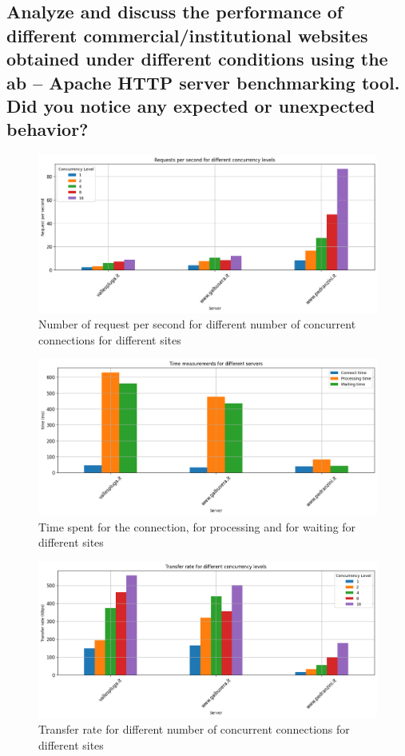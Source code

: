 \documentclass[eng]{class}
\begin{document}
\subsection*{Analyze and discuss the performance of different commercial/institutional websites obtained
  under different conditions using the ab – Apache HTTP server benchmarking tool. Did you
  notice any expected or unexpected behavior?}

\begin{figure}[H]
  \centering
  \includegraphics[width=.9\columnwidth]{images/Request_per_second_diff_conc.png}
  \caption{Number of request per second for different number of concurrent connections for different sites}
  \label{fig-3}
\end{figure}

\begin{figure}[H]
  \centering
  \includegraphics[width=.9\columnwidth]{images/time_diff_server.png}
  \caption{Time spent for the connection, for processing and for waiting for different sites}
  \label{fig-4}
\end{figure}

\begin{figure}[H]
  \centering
  \includegraphics[width=.9\columnwidth]{images/transf_diff_conc.png}
  \caption{Transfer rate for different number of concurrent connections for different sites}
  \label{fig-5}
\end{figure}
\end{document}
